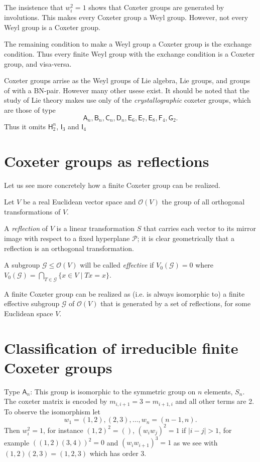 \documentclass[12pt]{article}
\begin{document}
The insistence that $w_i^2=1$ shows that Coxeter groups are generated by
involutions.  This makes every Coxeter group a Weyl group.  However, 
not every Weyl group is a Coxeter group.  

The remaining condition to make a Weyl group a Coxeter group is the exchange condition.  Thus every finite Weyl group with the exchange condition is a
Coxeter group, and visa-versa.

Coxeter groups arrise as the Weyl groups of Lie algebra, Lie groups, and groups of with a BN-pair.  However many other usese exist.  It should be noted
that the study of Lie theory makes use only of the \emph{crystallographic}
coxeter groups, which are those of type
\[\mathsf{A}_n, \mathsf{B}_n, \mathsf{C}_n, 
\mathsf{D}_n, \mathsf{E}_6, \mathsf{E}_7, \mathsf{E}_8, \mathsf{F}_4, 
\mathsf{G}_2.\]
Thus it omits $\mathsf{H}_2^n$, $\mathsf{I}_3$ and $\mathsf{I}_4$

\section{Coxeter groups as reflections}

Let us see more concretely how a finite Coxeter group can be realized.

Let $V$ be a real Euclidean vector space and $\mathcal O(V)$ the group of all orthogonal transformations of $V$. 

A \emph{reflection} of $V$ is a linear transformation $S$ that carries each vector to its mirror image with respect to a fixed hyperplane $\mathcal P$; it is clear geometrically that a reflection is an orthogonal transformation.

A subgroup $\mathcal G\le\mathcal O(V)$ will be called \emph{effective} if $V_0(\mathcal G)=0$ where $V_0(\mathcal G)=\bigcap_{T\in\mathcal G}\{x\in V\mid Tx=x\}$.

A finite Coxeter group can be realized as (i.e. is always isomorphic to) a finite effective subgroup $\mathcal G$ of $\mathcal O(V)$ that is generated by a set of reflections, for some Euclidean space $V$.

\section{Classification of irreducible finite Coxeter groups}

Type $\mathsf{A}_n$:  This group is isomorphic to the symmetric group on $n$ elements, $S_n$.  The coxeter matrix is encoded by $m_{i,i+1}=3=m_{i+1,i}$ and all other terms are 2.  To observe the isomorphism let
\[w_1=(1,2),(2,3),\dots,w_n=(n-1,n).\]
Then $w_i^2=1$, for instance $(1,2)^2=()$, $(w_i w_j)^2=1$ if $|i-j|>1$, for example $((1,2)(3,4))^2=0$ and $(w_i w_{i+1})^3=1$ as we see with $(1,2)(2,3)=(1,2,3)$ which has order 3.
\end{document}
